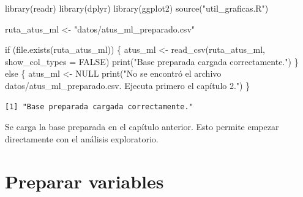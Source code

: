 \documentclass[
  spanish,
  10.5pt,
  letterpaper,
  openany,
  headings=big]{scrbook}
\newenvironment{Shaded}{}{}
\newcommand{\AttributeTok}[1]{\textcolor[rgb]{0.84,0.23,0.29}{#1}}
\newcommand{\ConstantTok}[1]{\textcolor[rgb]{0.00,0.36,0.77}{#1}}
\newcommand{\ControlFlowTok}[1]{\textcolor[rgb]{0.84,0.23,0.29}{#1}}
\newcommand{\FunctionTok}[1]{\textcolor[rgb]{0.44,0.26,0.76}{#1}}
\newcommand{\NormalTok}[1]{\textcolor[rgb]{0.14,0.16,0.18}{#1}}
\newcommand{\OtherTok}[1]{\textcolor[rgb]{0.44,0.26,0.76}{#1}}
\newcommand{\StringTok}[1]{\textcolor[rgb]{0.01,0.18,0.38}{#1}}
\begin{document}
\begin{Shaded}
\begin{Highlighting}[]
\FunctionTok{library}\NormalTok{(readr)}
\FunctionTok{library}\NormalTok{(dplyr)}
\FunctionTok{library}\NormalTok{(ggplot2)}
\FunctionTok{source}\NormalTok{(}\StringTok{"util\_graficas.R"}\NormalTok{)}

\NormalTok{ruta\_atus\_ml }\OtherTok{\textless{}{-}} \StringTok{"datos/atus\_ml\_preparado.csv"}

\ControlFlowTok{if}\NormalTok{ (}\FunctionTok{file.exists}\NormalTok{(ruta\_atus\_ml)) \{}
\NormalTok{  atus\_ml }\OtherTok{\textless{}{-}} \FunctionTok{read\_csv}\NormalTok{(ruta\_atus\_ml, }\AttributeTok{show\_col\_types =} \ConstantTok{FALSE}\NormalTok{)}
  \FunctionTok{print}\NormalTok{(}\StringTok{"Base preparada cargada correctamente."}\NormalTok{)}
\NormalTok{\} }\ControlFlowTok{else}\NormalTok{ \{}
\NormalTok{  atus\_ml }\OtherTok{\textless{}{-}} \ConstantTok{NULL}
  \FunctionTok{print}\NormalTok{(}\StringTok{"No se encontró el archivo datos/atus\_ml\_preparado.csv. Ejecuta primero el capítulo 2."}\NormalTok{)}
\NormalTok{\}}
\end{Highlighting}
\end{Shaded}

\begin{verbatim}
[1] "Base preparada cargada correctamente."
\end{verbatim}

\begin{tcolorbox}[enhanced jigsaw, arc=.35mm, bottomrule=.15mm, bottomtitle=1mm, breakable, colback=white, colbacktitle=quarto-callout-note-color!10!white, colframe=quarto-callout-note-color-frame, coltitle=black, left=2mm, leftrule=.75mm, opacityback=0, opacitybacktitle=0.6, rightrule=.15mm, title=\textcolor{quarto-callout-note-color}{\faInfo}\hspace{0.5em}{Explicación del código}, titlerule=0mm, toprule=.15mm, toptitle=1mm]

Se carga la base preparada en el capítulo anterior. Esto permite empezar
directamente con el análisis exploratorio.

\end{tcolorbox}

\section{Preparar variables}\label{preparar-variables}
\end{document}
